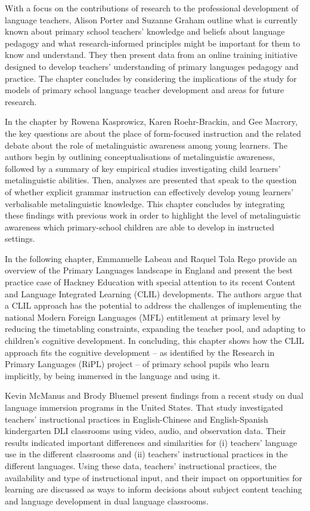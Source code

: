 \documentclass[output=paper]{langscibook}
\begin{document}
With a focus on the contributions of research to the professional development of language teachers, Alison Porter and Suzanne Graham outline what is currently known about primary school teachers’ knowledge and beliefs about language pedagogy and what research-informed principles might be important for them to know and understand. They then present data from an online training initiative designed to develop teachers’ understanding of primary languages pedagogy and practice. The chapter concludes by considering the implications of the study for models of primary school language teacher development and areas for future research.

In the chapter by Rowena Kasprowicz, Karen Roehr-Brackin, and Gee Macrory, the key questions are about the place of form-focused instruction and the related debate about the role of metalinguistic awareness among young learners. The authors begin by outlining conceptualisations of metalinguistic awareness, followed by a summary of key empirical studies investigating child learners’ metalinguistic abilities. Then, analyses are presented that speak to the question of whether explicit grammar instruction can effectively develop young learners’ verbalisable metalinguistic knowledge. This chapter concludes by integrating these findings with previous work in order to highlight the level of metalinguistic awareness which primary-school children are able to develop in instructed settings.

In the following chapter, Emmanuelle Labeau and Raquel Tola Rego provide an overview of the Primary Languages landscape in England and present the best practice case of Hackney Education with special attention to its recent Content and Language Integrated Learning (CLIL) developments. The authors argue that a CLIL approach has the potential to address the challenges of implementing the national Modern Foreign Languages (MFL) entitlement at primary level by reducing the timetabling constraints, expanding the teacher pool, and adapting to children’s cognitive development. In concluding, this chapter shows how the CLIL approach fits the cognitive development -- as identified by the Research in Primary Languages (RiPL) project -- of primary school pupils who learn implicitly, by being immersed in the language and using it.

Kevin McManus and Brody Bluemel present findings from a recent study on dual language immersion programs in the United States. That study investigated teachers’ instructional practices in English-Chinese and English-Spanish kindergarten DLI classrooms using video, audio, and observation data. Their results indicated important differences and similarities for (i) teachers’ language use in the different classrooms and (ii) teachers’ instructional practices in the different languages. Using these data, teachers’ instructional practices, the availability and type of instructional input, and their impact on opportunities for learning are discussed as ways to inform decisions about subject content teaching and language development in dual language classrooms.
\end{document}
